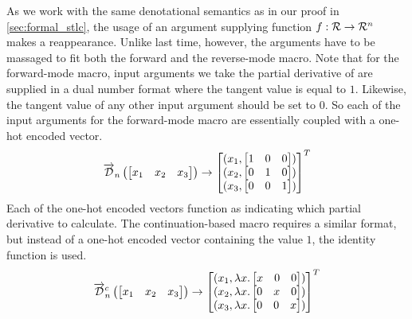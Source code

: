   As we work with the same denotational semantics as in our proof in \cref{sec:formal_stlc}, the usage of an argument supplying function $f : \mathcal{R} \rightarrow \mathcal{R}^n$ makes a reappearance.
  Unlike last time, however, the arguments have to be massaged to fit both the forward and the reverse-mode macro.
  Note that for the forward-mode macro, input arguments we take the partial derivative of are supplied in a dual number format where the tangent value is equal to $1$.
  Likewise, the tangent value of any other input argument should be set to $0$.
  So each of the input arguments for the forward-mode macro are essentially coupled with a one-hot encoded vector.
  \begin{equation*}
    \overrightarrow{\mathcal{D}}_n\left(
    \begin{bmatrix}
      x_1 & x_2 & x_3 \\
    \end{bmatrix}\right)
    \to
    \begin{bmatrix}
      (x_1,
        \begin{bmatrix}
          1 & 0 & 0 \\
        \end{bmatrix}) \\
      (x_2,
        \begin{bmatrix}
          0 & 1 & 0 \\
        \end{bmatrix}) \\
      (x_3,
        \begin{bmatrix}
          0 & 0 & 1 \\
        \end{bmatrix}) \\
    \end{bmatrix}^T
  \end{equation*}
  Each of the one-hot encoded vectors function as indicating which partial derivative to calculate.
  The continuation-based macro requires a similar format, but instead of a one-hot encoded vector containing the value $1$, the identity function is used.
  \begin{equation*}
    \overrightarrow{\mathcal{D}}^c_n\left(
    \begin{bmatrix}
      x_1 & x_2 & x_3 \\
    \end{bmatrix}\right)
    \to
    \begin{bmatrix}
      (x_1,
        \lambda x.
        \begin{bmatrix}
          x & 0 & 0 \\
        \end{bmatrix}) \\
      (x_2,
        \lambda x.
        \begin{bmatrix}
          0 & x & 0 \\
        \end{bmatrix}) \\
      (x_3,
        \lambda x.
        \begin{bmatrix}
          0 & 0 & x \\
        \end{bmatrix}) \\
    \end{bmatrix}^T
  \end{equation*}

